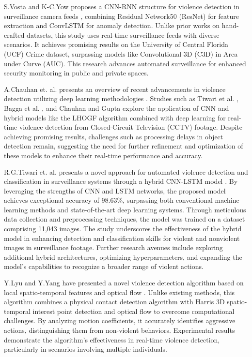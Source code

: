 \noindent S.Vosta and K-C.Yow proposes a CNN-RNN structure for violence detection in surveillance camera feeds \cite{cnn-rnn}, combining Residual Network50 (ResNet) for feature extraction and ConvLSTM for anomaly detection. Unlike prior works on hand-crafted datasets, this study uses real-time surveillance feeds with diverse scenarios. It achieves promising results on the University of Central Florida (UCF) Crime dataset, surpassing models like Convolutional 3D (C3D) in Area under Curve (AUC). This research advances automated surveillance for enhanced security monitoring in public and private spaces.

\noindent A.Chauhan et. al. presents an overview of recent advancements in violence detection utilizing deep learning methodologies \cite{lhogf-deeplearn}. Studies such as Tiwari et al. \cite{hyb-cnn-lstm}, Bagga et al. \cite{mobnetv2-inceptionv3}, and Chauhan and Gupta \cite{lhogf-deeplearn} explore the application of CNN and hybrid models like the LHOGF algorithm combined with deep learning for real-time violence detection from Closed-Circuit Television (CCTV) footage. Despite achieving promising results, challenges such as processing delays in object detection remain, suggesting the need for further refinement and optimization of these models to enhance their real-time performance and accuracy.

\noindent R.G.Tiwari et. al. presents a novel approach for automated violence detection and classification in surveillance systems through a hybrid CNN-LSTM model \cite{hyb-cnn-lstm}. By leveraging the strengths of CNN and LSTM networks, the proposed model achieves exceptional accuracy of 98.63\%, surpassing both conventional machine learning methods and state-of-the-art deep learning systems. Through meticulous data collection and preprocessing techniques, the model was trained on a dataset comprising 11,043 images. The study underscores the effectiveness of the hybrid model in enhancing detection and classification skills for violent and nonviolent images in surveillance footage. Further research avenues include exploring additional hybrid architectures, optimizing hyperparameters, and expanding the model's capabilities to recognize a broader range of violent actions.

\clearpage

\noindent Y.Lyu and Y.Yang have presented a novel violence detection algorithm based on local spatio-temporal features and optical flow \cite{Harris3d-spatio-temporal}. Unlike existing methods, this algorithm combines a physical contact detection algorithm with Harris 3D spatio-temporal interest point detection and optical flow to overcome computational challenges. By analyzing motion coefficients, it accurately identifies aggressive actions, distinguishing them from non-violent behaviors. Experimental results demonstrate the algorithm's effectiveness in real-time violence detection, particularly in scenarios involving multiple individuals.

